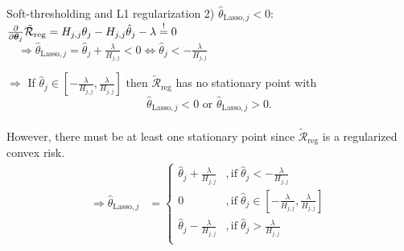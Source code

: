 \documentclass[11pt,compress,t,notes=noshow, xcolor=table]{beamer}
\begin{document}
\begin{vbframe}{Soft-thresholding and L1 regularization}
2) $\hat{\theta}_{\text{Lasso},j} < 0:$
$\frac{\partial}{\partial \bm{\theta}_j}\mathcal{\tilde R}_{\text{reg}} = H_{j,j}\theta_j - H_{j,j} \hat{\theta}_j - \lambda \overset{!}{=} 0$ \\
$\quad \Rightarrow  \hat{\theta}_{\text{Lasso},j} = \hat{\theta}_j 
 + \frac{\lambda}{H_{j,j}} < 0 \iff \hat{\theta}_j <  -\frac{\lambda}{H_{j,j}}$\\
 \lz

$\Rightarrow$ If $\hat{\theta}_j \in [-\frac{\lambda}{H_{j,j}}, \frac{\lambda}{H_{j,j}}]$ then $\mathcal{\tilde R}_{\text{reg}}$ has no stationary point with $$\hat{\theta}_{\text{Lasso},j} < 0 \text{ or } \hat{\theta}_{\text{Lasso},j} > 0.$$ \\
However, there must be at least one stationary point since $\mathcal{\tilde R}_{\text{reg}}$ is a regularized convex risk. \\

\begin{align*}\Rightarrow \hat{\theta}_{\text{Lasso},j} &= \begin{cases} 
     \hat{\theta}_j + \frac{\lambda}{H_{j,j}} &, \text{if}   \;\hat{\theta}_j < -\frac{\lambda}{H_{j,j}} \\
       0 &, \text{if}   \;\hat{\theta}_j \in [-\frac{\lambda}{H_{j,j}}, \frac{\lambda}{H_{j,j}}] \\
     \hat{\theta}_j - \frac{\lambda}{H_{j,j}} &, \text{if}   \;\hat{\theta}_j > \frac{\lambda}{H_{j,j}} \\
     \end{cases}
     \end{align*}

\end{vbframe}

\endlecture
\end{document}
